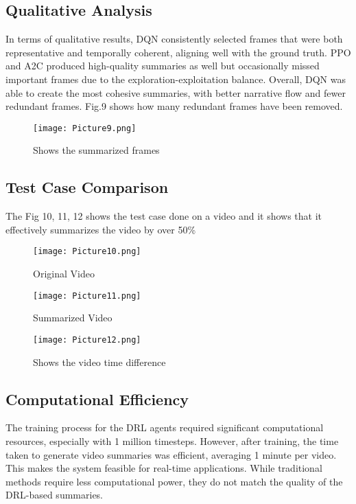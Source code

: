 \documentclass[conference]{IEEEtran}
\begin{document}
\subsection{\textbf{Qualitative Analysis}}
In terms of qualitative results, DQN consistently selected frames that were both representative and temporally coherent, aligning well with the ground truth. PPO and A2C produced high-quality summaries as well but occasionally missed important frames due to the exploration-exploitation balance. Overall, DQN was able to create the most cohesive summaries, with better narrative flow and fewer redundant frames. Fig.9 shows how many redundant frames have been removed.

\begin{figure}[htbp]
\centerline{\texttt{[image: Picture9.png]}}
\caption{Shows the summarized frames}
\label{fig}
\end{figure}

\subsection{\textbf{Test Case Comparison}}
The Fig 10, 11, 12 shows the test case done on a video and it shows that it effectively summarizes the video by over 50\%

\begin{figure}[htbp]
\centerline{\texttt{[image: Picture10.png]}}
\caption{Original Video}
\label{fig}
\end{figure}

\begin{figure}[htbp]
\centerline{\texttt{[image: Picture11.png]}}
\caption{Summarized Video}
\label{fig}
\end{figure}

\begin{figure}[htbp]
\centerline{\texttt{[image: Picture12.png]}}
\caption{Shows the video time difference}
\label{fig}
\end{figure}

\subsection{\textbf{Computational Efficiency}}
The training process for the DRL agents required significant computational resources, especially with 1 million timesteps. However, after training, the time taken to generate video summaries was efficient, averaging 1 minute per video. This makes the system feasible for real-time applications. While traditional methods require less computational power, they do not match the quality of the DRL-based summaries.
\end{document}
